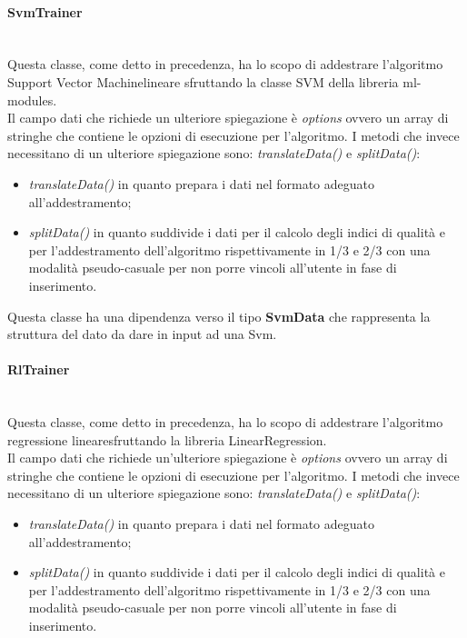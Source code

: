 		\paragraph*{SvmTrainer} \mbox{} \\[1mm]
		Questa classe, come detto in precedenza, ha lo scopo di addestrare l'algoritmo Support Vector Machine\glosp lineare sfruttando la classe SVM della libreria ml-modules. \\
		Il campo dati che richiede un ulteriore spiegazione è \textit{options} ovvero un array di stringhe che contiene le opzioni di esecuzione per l'algoritmo.
		I metodi che invece necessitano di un ulteriore spiegazione sono: \textit{translateData()} e \textit{splitData()}:\begin{itemize}
			\item \textit{translateData()} in quanto prepara i dati nel formato adeguato all'addestramento;
			\item \textit{splitData()} in quanto suddivide i dati per il calcolo degli indici di qualità e per l'addestramento dell'algoritmo rispettivamente in 1/3 e 2/3 con una modalità pseudo-casuale per non porre vincoli all'utente in fase di inserimento.
		\end{itemize}
		Questa classe ha una dipendenza verso il tipo \textbf{SvmData} che rappresenta la struttura del dato da dare in input ad una Svm\glo.
		\paragraph*{RlTrainer} \mbox{} \\[1mm]
		Questa classe, come detto in precedenza, ha lo scopo di addestrare l'algoritmo regressione lineare\glosp sfruttando la libreria LinearRegression. \\
		Il campo dati che richiede un'ulteriore spiegazione è \textit{options} ovvero un array di stringhe che contiene le opzioni di esecuzione per l'algoritmo.
		I metodi che invece necessitano di un ulteriore spiegazione sono: \textit{translateData()} e \textit{splitData()}: 
		\begin{itemize}
			\item \textit{translateData()} in quanto prepara i dati nel formato adeguato all'addestramento;
			\item \textit{splitData()} in quanto suddivide i dati per il calcolo degli indici di qualità e per l'addestramento dell'algoritmo rispettivamente in 1/3 e 2/3 con una modalità pseudo-casuale per non porre vincoli all'utente in fase di inserimento.
		\end{itemize}

